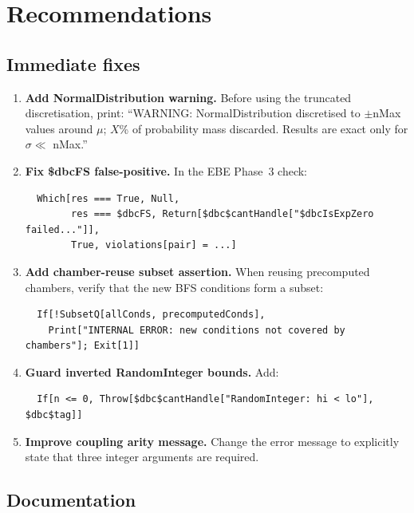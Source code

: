 \documentclass[12pt,a4paper]{article}
\theoremstyle{critical}
\theoremstyle{remark}
\theoremstyle{verified}
\begin{document}
\section{Recommendations}
\label{sec:recommendations}

\subsection{Immediate fixes}

\begin{enumerate}
\item \textbf{Add NormalDistribution warning.}  Before using the truncated
  discretisation, print: ``WARNING: NormalDistribution discretised to $\pm$nMax
  values around $\mu$; $X$\% of probability mass discarded. Results are exact
  only for $\sigma \ll$ nMax.''

\item \textbf{Fix \$dbcFS false-positive.}  In the EBE Phase~3 check:
  \begin{lstlisting}
  Which[res === True, Null,
        res === $dbcFS, Return[$dbc$cantHandle["$dbcIsExpZero failed..."]],
        True, violations[pair] = ...]
  \end{lstlisting}

\item \textbf{Add chamber-reuse subset assertion.}  When reusing precomputed
  chambers, verify that the new BFS conditions form a subset:
  \begin{lstlisting}
  If[!SubsetQ[allConds, precomputedConds],
    Print["INTERNAL ERROR: new conditions not covered by chambers"]; Exit[1]]
  \end{lstlisting}

\item \textbf{Guard inverted RandomInteger bounds.}  Add:
  \begin{lstlisting}
  If[n <= 0, Throw[$dbc$cantHandle["RandomInteger: hi < lo"], $dbc$tag]]
  \end{lstlisting}

\item \textbf{Improve coupling arity message.}  Change the error message to
  explicitly state that three integer arguments are required.
\end{enumerate}

\subsection{Documentation}
\end{document}
